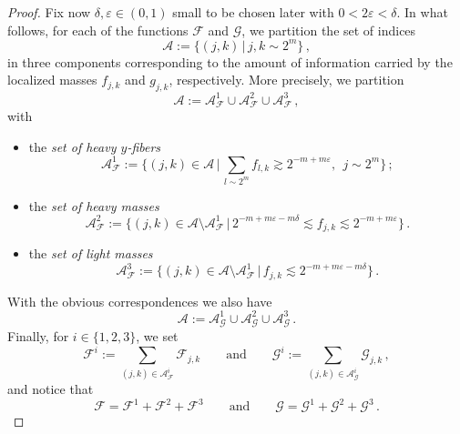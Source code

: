 \documentclass[a4paper,reqno]{amsart}
\numberwithin{equation}{section}
\theoremstyle{definition}
\def\F{\mathcal{F}}
\def\G{\mathcal{G}}
\def\v{\varepsilon}
\def\A{\mathcal{A}}
\def\d{\delta}
\begin{document}
\begin{proof}
Fix now $\d,\v\in (0,1)$ small to be chosen later with $0<2\v<\d$. In what follows, for each of the functions $\F$ and $\G$, we partition the set of indices
\begin{equation}\label{A}
	\A:=\{(j,k)\,|\,j,k\sim 2^m\}\,,
\end{equation}
in three components corresponding to the amount of information carried by the localized masses $f_{j,k}$ and $g_{j,k}$, respectively. More precisely, we partition
\begin{equation}\label{decA}
	\A:=\A_{\F}^{1}\cup \A_{\F}^{2}\cup \A_{\F}^{3} \,,
\end{equation}
with
\begin{itemize}
	\item the \emph{set of heavy $y$-fibers}
	\begin{equation}\label{A1}
		\A_{\F}^{1}:=\Big\{(j,k)\in\A\,|\,\sum_{l\sim 2^m} f_{l,k}\gtrsim 2^{-m+m\v},\:\:j\sim 2^m\Big\}\,;
	\end{equation}
	\item  the \emph{set of heavy masses}
	\begin{equation}\label{A2}
		\A_{\F}^{2}:=\Big\{(j,k)\in \A\setminus \A_{\F}^{1}\,|\,2^{-m+m\v-m\d}\lesssim f_{j,k}\lesssim 2^{-m+m\v}\Big\}\,.
	\end{equation}
	\item the \emph{set of light masses}
	\begin{equation}\label{A3}
		\A_{\F}^{3}:=\Big\{(j,k)\in \A\setminus \A_{\F}^{1}\,|\,f_{j,k}\lesssim 2^{-m+m\v-m\d}\Big\}\,.
	\end{equation}
\end{itemize}

With the obvious correspondences we also have
\begin{equation}\label{decAG}
	\A:=\A_{\G}^{1}\cup \A_{\G}^{2}\cup \A_{\G}^{3} \,.
\end{equation}
Finally, for $i\in\{1,2,3\}$, we set
\begin{equation}\label{FGi}
	\F^{i}:=\sum_{(j,k)\in \A_{\F}^{i}} \F_{j,k}\qquad\textrm{and}\qquad \G^{i}:=\sum_{(j,k)\in \A_{\G}^{i}} \G_{j,k}\,,
\end{equation}
and notice that
\begin{equation}\label{FGsum}
	\F=\F^{1}+\F^{2}+\F^{3}\qquad\textrm{and}\qquad\G=\G^{1}+\G^{2}+\G^{3}\,.
\end{equation}


\end{proof}
\end{document}
